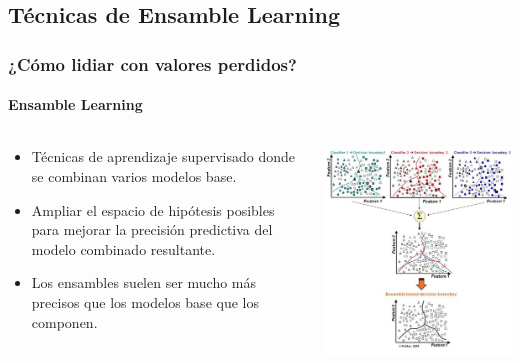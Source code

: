 \documentclass{beamer}
\begin{document}
\subsection{Técnicas de Ensamble Learning}
\begin{frame}
	\frametitle{¿Cómo lidiar con valores perdidos?}
	\framesubtitle{Ensamble Learning}
	\begin{columns}
		\begin{column}{0.48\textwidth}
			\begin{itemize}		
					\item Técnicas de aprendizaje supervisado donde se combinan varios modelos base.
					\item Ampliar el espacio de hipótesis posibles para mejorar la precisión predictiva del modelo combinado resultante.
					\item Los ensambles suelen ser mucho más precisos que los modelos base que los componen.
			\end{itemize}
		\end{column}
		\begin{column}{0.85\textwidth}
			\includegraphics[width=0.657\linewidth, height=0.7\textheight]{img/ensamble.jpg}
		\end{column}
	\end{columns}
\end{frame}
\end{document}
